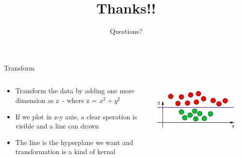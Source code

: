 \documentclass[aspectratio=169, 14pt]{beamer}
\begin{document}
\begin{frame}[t]{Transform}
\begin{columns}
	\begin{column}{0.55\textwidth}
        \begin{itemize}
	\item Transform the data by adding one more dimension as z\
              - where z = $x^{2} + y^{2}$
	\item If we plot in z-y axis, a clear speration is visible  and a line can drawn
        \item The line is the hyperplane we want and transformation is a kind of kernal
	\end{itemize}
	\end{column}
	\begin{column}{0.45\textwidth}
		\vskip-0.5cm
		\includegraphics[width=0.9\textwidth]{SVM_NonLinear_Images/AIML_SVM_IMG10.png}
        \end{column}
\end{columns}

\end{frame}


{\1   
\begin{frame}
\title{Thanks!!}
	\subtitle{Questions?}
	\titlepage
\end{frame}
}
\end{document}
